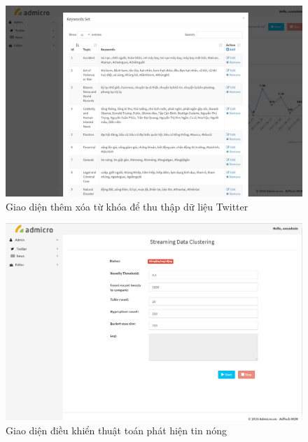 \begin{figure}[H]
	\centering
	\includegraphics[width=0.96\linewidth]{Chapter3/Chapter3Figs/StreamingKeywords}
	\caption{Giao diện thêm xóa từ khóa để thu thập dữ liệu Twitter}
	\label{fig:streamingkeywords}
\end{figure}

\begin{figure}[H]
		\centering
	\includegraphics[width=0.96\linewidth]{Chapter3/Chapter3Figs/StartClustering}
	\caption{Giao diện điều khiển thuật toán phát hiện tin nóng}
	\label{fig:startclustering}
\end{figure}

